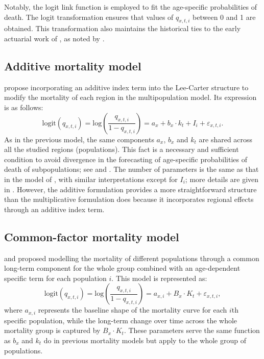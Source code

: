 Notably, the logit link function is employed to fit the age-specific probabilities of death. The logit transformation ensures that values of $q_{x,t,i}$ between 0 and 1 \citep{Lee2000} are obtained. This transformation also maintains the historical ties to the early actuarial work of \citet{Perks1932}, as noted by \citet{Haberman2011}.

\subsection{Additive mortality model}

\citet{Debon2011} propose incorporating an additive index term into the Lee-Carter structure to modify the mortality of each region in the multipopulation model. Its expression is as follows:
\begin{equation}
\textrm{logit}\left(q_{x,t,i} \right)=\textrm{log}\left(\frac{q_{x,t,i}}{1-q_{x,t,i}}\right)=a_x + b_x \cdot k_t + I_i + \varepsilon_{x,t,i}.
\label{EQ_addit}
\end{equation}
As in the previous model, the same components $a_x$, $b_x$ and $k_t$ are shared across all the studied regions (populations). This fact is a necessary and sufficient condition to avoid divergence in the forecasting of age-specific probabilities of death of subpopulations; see \citet{Debon2011} and \citet{Ahcan2014}. The number of parameters is the same as that in the model of \citet{Russolillo2011}, with similar interpretations except for $I_i$; more details are given in \citet{Debon2011}. However, the additive formulation provides a more straightforward structure than the multiplicative formulation does because it incorporates regional effects through an additive index term.

\subsection{Common-factor mortality model}

\citet{Carter1992} and \citet{Li2005} proposed modelling the mortality of different populations through a common long-term component for the whole group combined with an age-dependent specific term for each population $i$. This model is represented as:
\begin{equation}
\textrm{logit}\left(q_{x,t,i} \right)=\textrm{log}\left(\frac{q_{x,t,i}}{1-q_{x,t,i}}\right)=a_{x,i} + B_x \cdot K_t + \varepsilon_{x,t,i},
\label{EQ_CFM}
\end{equation}
where $a_{x,i}$ represents the baseline shape of the mortality curve for each $i$th specific population, while the long-term change over time across the whole mortality group is captured by $B_x \cdot K_t$. These parameters serve the same function as $b_x$ and $k_t$ do in previous mortality models but apply to the whole group of populations.

